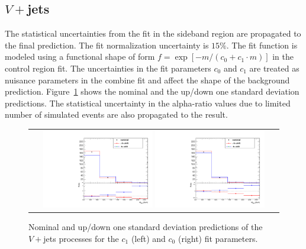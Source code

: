 \subsection{$V+$jets}
The statistical uncertainties from the fit in the sideband region are propagated to the final prediction. The fit normalization uncertainty is $15\%$. The fit function is modeled using a functional shape of form $f=\exp\left[-m/(c_{0}+c_1\cdot m)\right]$ in the control region fit. The uncertainties in the fit parameters $c_{0}$ and $c_{1}$ are treated as nuisance parameters in the combine fit and affect the shape of the background prediction. Figure~\ref{fig:wjet} shows the nominal and the up/down one standard deviation predictions. The statistical uncertainty in the alpha-ratio values due to limited number of simulated events are also propagated to the result. 

\begin{figure}[!htbp]
  \begin{center}
    \begin{tabular}{c}
    \includegraphics[width=0.45\textwidth]{Plots/systematic/WjetFitSyst_Par0_Wjets.pdf}%
    \includegraphics[width=0.45\textwidth]{Plots/systematic/WjetFitSyst_Par1_Wjets.pdf}%
    \end{tabular}
    \caption{Nominal and up/down one standard deviation predictions of the $V+$jets processes for the $c_{1}$ (left) and $c_{0}$ (right) fit parameters.}
    \label{fig:wjet}
  \end{center}
\end{figure}

